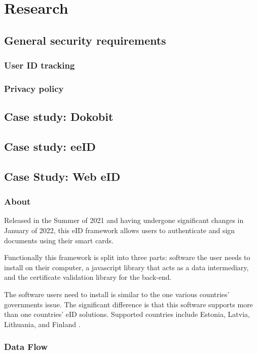 \section{Research}
\subsection{General security requirements}
\subsubsection{User ID tracking}
\subsubsection{Privacy policy} 
\subsection{Case study: Dokobit}
\subsection{Case study: eeID}
\subsection{Case Study: Web eID}

\subsubsection{About}

Released in the Summer of 2021 \cite{ria-webeid} and having undergone significant changes in January of 2022, this eID framework allows users to authenticate and sign documents using their smart cards.

Functionally this framework is split into three parts: software the user needs to install on their computer, a javascript library that acts as a data intermediary, and the certificate validation library for the back-end.

The software users need to install is similar to the one various countries' governments issue. The significant difference is that this software supports more than one countries' eID solutions. Supported countries include Estonia, Latvia, Lithuania, and Finland \cite{ria-webeid}.

\subsubsection{Data Flow}

